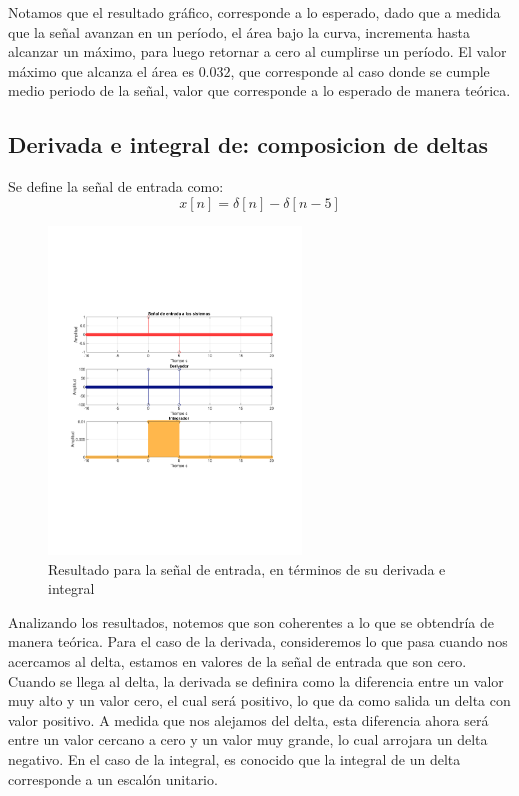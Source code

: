 		Notamos que el resultado gráfico, corresponde a lo esperado, dado que a medida que la señal avanzan en un período, el área bajo la curva, incrementa hasta alcanzar un máximo, para luego retornar a cero al cumplirse un período. El valor máximo que alcanza el área es $0.032$, que corresponde al caso donde se cumple medio periodo de la señal, valor que corresponde a lo esperado de manera teórica. 
	\subsection{Derivada e integral de: composicion de deltas}
		Se define la señal de entrada como:
		\begin{equation}
			x[n] = \delta [n] - \delta [n-5] 
		\end{equation}
		
		\begin{figure}[H]
			\center
			\includegraphics[width=0.6\textwidth,clip, trim = {2cm 7.0cm 2.2cm 7.0cm}]{../imgs/3_c.pdf}
			\caption{Resultado para la señal de entrada, en términos de su derivada e integral}
			\label{fig:3_c}
		\end{figure}
		
		Analizando los resultados, notemos que son coherentes a lo que se obtendría de manera teórica. Para el caso de la derivada, consideremos lo que pasa cuando nos acercamos al delta, estamos en valores de la señal de entrada que son cero. Cuando se llega al delta, la derivada se definira como la diferencia entre un valor muy alto y un valor cero, el cual será positivo, lo que da como salida un delta con valor positivo. A medida que nos alejamos del delta, esta diferencia ahora será entre un valor cercano a cero y un valor muy grande, lo cual arrojara un delta negativo. En el caso de la integral, es conocido que la integral de un delta corresponde a un escalón unitario.
